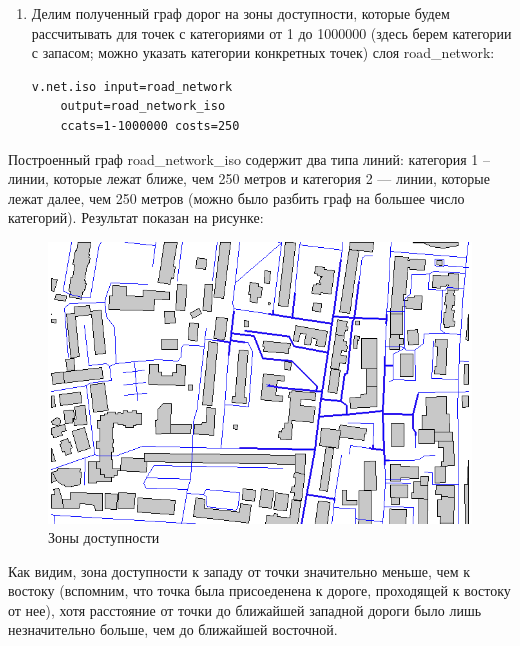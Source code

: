 \begin{frame}
\begin{enumerate}
\begin{enumerate}
\begin{figure}[!ht]
\begin{center}
                \end{center}
            \end{figure}
        \end{enumerate}
        \item Делим полученный граф дорог на зоны доступности, которые будем рассчитывать для точек с категориями от 1 до 1000000 (здесь берем категории с запасом; можно указать категории конкретных точек) слоя road\_network:
        \begin{verbatim}
v.net.iso input=road_network
    output=road_network_iso
    ccats=1-1000000 costs=250
            \end{verbatim}
    \end{enumerate}
    Построенный граф road\_network\_iso содержит два типа линий: категория 1 -- линии, которые лежат ближе, чем 250 метров и категория 2 --- линии, которые лежат далее, чем 250 метров (можно было разбить граф на большее число категорий). Результат показан на рисунке:
            \begin{figure}[!ht]
                \begin{center}
                    \includegraphics[width=0.9\columnwidth]{./practic/img/roads_iso}
                \end{center}
                \caption{Зоны доступности}
            \end{figure}
    Как видим, зона доступности к западу от точки значительно меньше, чем к востоку (вспомним, что точка была присоеденена к дороге, проходящей к востоку от нее), хотя расстояние от точки до ближайшей западной дороги было лишь незначительно больше, чем до ближайшей восточной.
\end{frame}


